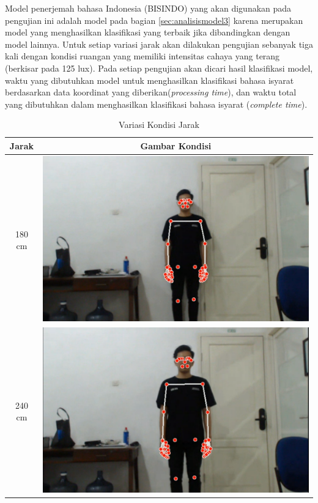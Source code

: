 Model penerjemah bahasa Indonesia (BISINDO) yang akan digunakan pada pengujian ini adalah model pada bagian \ref{sec:analisismodel3} karena merupakan model yang menghasilkan klasifikasi yang terbaik jika dibandingkan dengan model lainnya. Untuk setiap variasi jarak akan dilakukan pengujian sebanyak tiga kali dengan kondisi ruangan yang memiliki intensitas cahaya yang terang (berkisar pada 125 lux). Pada setiap pengujian akan dicari hasil klasifikasi model, waktu yang dibutuhkan model untuk menghasilkan klasifikasi bahasa isyarat berdasarkan data koordinat yang diberikan(\emph{processing time}), dan waktu total yang dibutuhkan dalam menghasilkan klasifikasi bahasa isyarat (\emph{complete time}).  

\newpage
\begin{longtable}{|c|c|}
  \caption{Variasi Kondisi Jarak}
  \label{tb:kondisijarak}                                   \\
  \hline
  \rowcolor[HTML]{C0C0C0}
  \textbf{Jarak} & \textbf{Gambar Kondisi}  \\
  \hline
  180 cm            &  \includegraphics[scale=0.15]{gambar/bab4-jarak180.png}                \\
  \hline
  240 cm            & \includegraphics[scale=0.15]{gambar/bab4-jarak240.png}                 \\

\end{longtable}
